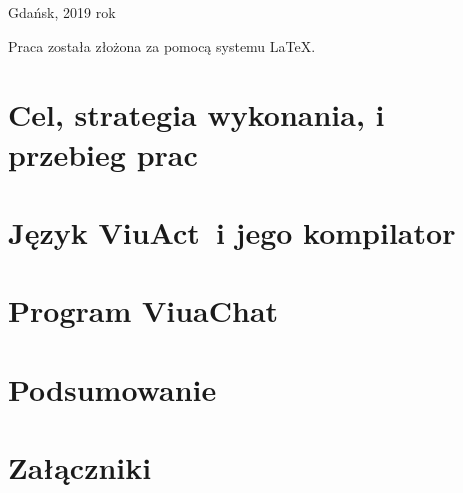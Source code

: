 \documentclass[11pt,oneside,a4paper,titlepage,onecolumn]{book}
\newcommand{\ViuAct}{ViuAct}
\begin{document}
\begin{titlepage}
    \vspace*{\fill}
    \begin{center}
    Gdańsk, 2019 rok
    \end{center}
\end{titlepage}

\frontmatter
\tableofcontents
\listoffigures
\lstlistoflistings

Praca została złożona za pomocą systemu \LaTeX.

\newpage

\mainmatter
\part{Cel, strategia wykonania, i przebieg prac}







\part{Język \ViuAct\ i jego kompilator}







\part{Program ViuaChat}





\part{Podsumowanie}






% 
% 
% 


\part{Załączniki}

\appendix




\end{document}
